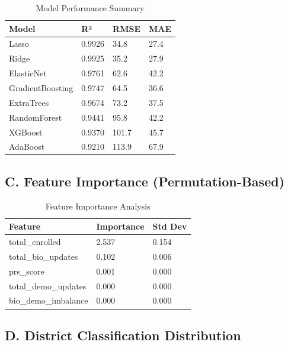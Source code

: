 \documentclass[11pt, a4paper]{article}
\begin{document}
\vspace{0.8em}
\begin{table}[H]
\caption{Model Performance Summary}
{\small
\begin{tabularx}{\textwidth}{|Y|Y|Y|Y|}
\hline
\textbf{Model} & \textbf{R²} & \textbf{RMSE} & \textbf{MAE} \\ \hline
Lasso & 0.9926 & 34.8 & 27.4 \\ \hline
Ridge & 0.9925 & 35.2 & 27.9 \\ \hline
ElasticNet & 0.9761 & 62.6 & 42.2 \\ \hline
GradientBoosting & 0.9747 & 64.5 & 36.6 \\ \hline
ExtraTrees & 0.9674 & 73.2 & 37.5 \\ \hline
RandomForest & 0.9441 & 95.8 & 42.2 \\ \hline
XGBoost & 0.9370 & 101.7 & 45.7 \\ \hline
AdaBoost & 0.9210 & 113.9 & 67.9 \\ \hline
\end{tabularx}
}
\end{table}
\vspace{1em}

\subsection{C. Feature Importance (Permutation-Based)}

\vspace{0.8em}
\begin{table}[H]
\caption{Feature Importance Analysis}
{\small
\begin{tabularx}{\textwidth}{|Y|Y|Y|}
\hline
\textbf{Feature} & \textbf{Importance} & \textbf{Std Dev} \\ \hline
total\_enrolled & 2.537 & 0.154 \\ \hline
total\_bio\_updates & 0.102 & 0.006 \\ \hline
prs\_score & 0.001 & 0.000 \\ \hline
total\_demo\_updates & 0.000 & 0.000 \\ \hline
bio\_demo\_imbalance & 0.000 & 0.000 \\ \hline
\end{tabularx}
}
\end{table}
\vspace{1em}

\subsection{D. District Classification Distribution}
\end{document}
